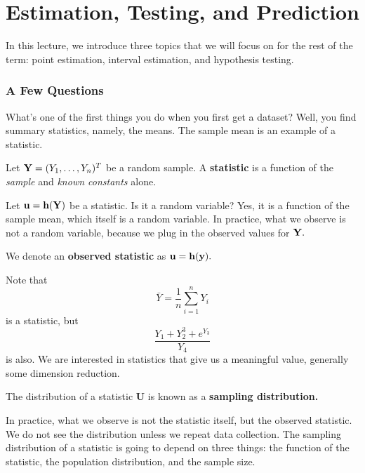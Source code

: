 \chapter{\texorpdfstring{Estimation, Testing, and Prediction}{Estimation, Testing, and Prediction}}

In this lecture, we introduce three topics that we will focus on for the rest of the term: point estimation, interval estimation, and hypothesis testing.

\subsection{A Few Questions}
What's one of the first things you do when you first get a dataset? Well, you find summary statistics, namely, the means. The sample mean is an example of a statistic.

\begin{definition}
Let $\mathbf Y=(Y_1,\ldots,Y_n)^T$ be a random sample. A \textbf{statistic} is a function of the \textit{sample} and \textit{known constants} alone.
\end{definition}

Let $\mathbf u=\mathbf h(\mathbf Y)$ be a statistic. Is it a random variable? Yes, it is a function of the sample mean, which itself is a random variable. In practice, what we observe is not a random variable, because we plug in the observed values for $\mathbf Y.$ 

\begin{definition}
We denote an \textbf{observed statistic} as $\mathbf u=\mathbf h(\mathbf y).$
\end{definition}

\begin{eg}
Note that 
$$
\bar Y=\frac{1}{n}\sum^n_{i=1}Y_i
$$
is a statistic, but
$$
\frac{Y_1+Y_2^3+e^{Y_3}}{Y_4}
$$
is also. We are interested in statistics that give us a meaningful value, generally some dimension reduction.
\end{eg}

\begin{definition}
The distribution of a statistic $\mathbf U$ is known as a \textbf{sampling distribution.}
\end{definition}
In practice, what we observe is not the statistic itself, but the observed statistic. We do not see the distribution unless we repeat data collection. The sampling distribution of a statistic is going to depend on three things: the function of the statistic, the population distribution, and the sample size.

